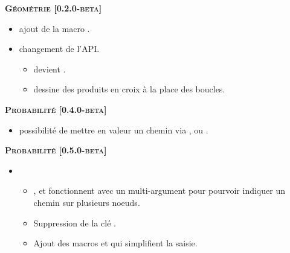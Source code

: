 \begin{center}
    \textbf{\textsc{Géométrie [0.2.0-beta]}}
\end{center}

\begin{itemize}[itemsep=.5em]
    \item {}
          ajout de la macro .


    \item {} changement de l'API.
    \begin{itemize}[itemsep=.5em]
        \item {} devient .

        \item {} dessine des produits en croix à la place des boucles.
    \end{itemize}


\end{itemize}


\separation




\begin{center}
    \textbf{\textsc{Probabilité [0.4.0-beta]}}
\end{center}

\begin{itemize}[itemsep=.5em]
    \item {}
    	  possibilité de mettre en valeur un chemin via ,   ou .
\end{itemize}


\begin{center}
    \textbf{\textsc{Probabilité [0.5.0-beta]}}
\end{center}

\begin{itemize}[itemsep=.5em]
    \item {}
    \begin{itemize}[itemsep=.5em]
        \item {},  et  fonctionnent avec un multi-argument pour pourvoir indiquer un chemin sur plusieurs noeuds.
        
        \item Suppression de la clé .
        
        \item Ajout des macros  et  qui simplifient la saisie.
    \end{itemize}
\end{itemize}


